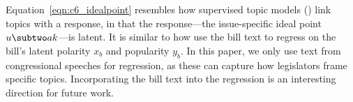 Equation~\ref{eqn:c6_idealpoint} resembles how supervised topic models (\slda{}) link topics with a response, in that the response---the issue-specific ideal point $u \subtwo ak$---is latent. It is similar to how  use the bill text to regress on the bill's latent polarity $x_b$ and popularity $y_b$. In this paper, we only use text from congressional speeches for regression, as these can capture how legislators frame specific topics. Incorporating the bill text into the regression is an interesting direction for future work.
































































































